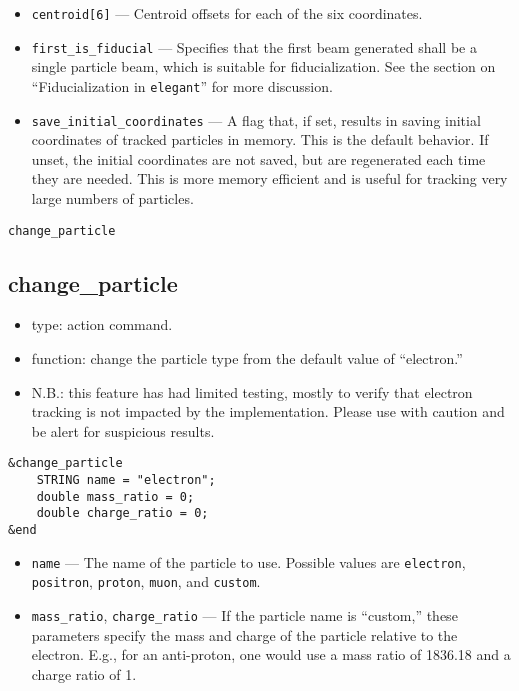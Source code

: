 \documentclass[11pt]{article}
\begin{document}
\begin{itemize}
\item \verb|centroid[6]| --- Centroid offsets for each of the six coordinates.

\item \verb|first_is_fiducial| --- Specifies that the first beam
generated shall be a single particle beam, which is suitable for
fiducialization.  See the section on ``Fiducialization in
\verb|elegant|'' for more discussion.

\item \verb|save_initial_coordinates| --- A flag that, if set, results
in saving initial coordinates of tracked particles in memory.  This is
the default behavior.  If unset, the initial coordinates are not
saved, but are regenerated each time they are needed.  This is more
memory efficient and is useful for tracking very large numbers of
particles.
\end{itemize}

\begin{latexonly}
\newpage
\begin{center}{\Large\verb|change_particle|}\end{center}
\end{latexonly}
\subsection{change\_particle\label{subsec:changeparticle}}

\begin{itemize}
\item type: action command.
\item function: change the particle type from the default value of ``electron.''
\item N.B.: this feature has had limited testing, mostly to verify that electron tracking is not
 impacted by the implementation.  Please use with caution and be alert for suspicious results.
\end{itemize}

\begin{verbatim}
&change_particle
    STRING name = "electron";
    double mass_ratio = 0;
    double charge_ratio = 0;
&end
\end{verbatim}

\begin{itemize}
\item \verb|name| --- The name of the particle to use.  Possible values are \verb|electron|, \verb|positron|,
  \verb|proton|, \verb|muon|, and \verb|custom|.
\item \verb|mass_ratio|, \verb|charge_ratio| --- If the particle name is ``custom,'' these parameters specify the
  mass and charge of the particle relative to the electron.  E.g., for an anti-proton, one would use
  a mass ratio of 1836.18 and a charge ratio of 1.
\end{itemize}
\end{document}
